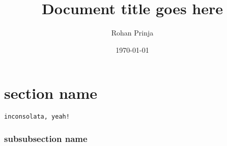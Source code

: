 \documentclass[a4paper]{article}
\title{Document title goes here}
\author{Rohan Prinja}
\date{\today}
\begin{document}
\maketitle

\section{section name} %
\label{sec:section_name}

\texttt{inconsolata, yeah!}

\subsubsection{subsubsection name} %
\label{ssub:subsubsection_name}


\end{document}
